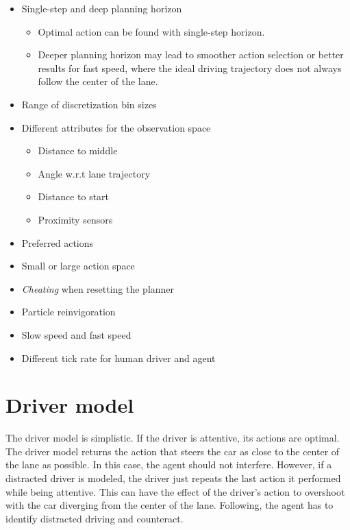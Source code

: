 \begin{itemize}
    \item Single-step and deep planning horizon
    \begin{itemize}
        \item Optimal action can be found with single-step horizon.
        \item Deeper planning horizon may lead to smoother action selection or better results for fast speed, where the ideal driving trajectory does not always follow the center of the lane.
    \end{itemize}
    \item Range of discretization bin sizes
    \item Different attributes for the observation space
    \begin{itemize}
        \item Distance to middle
        \item Angle w.r.t lane trajectory
        \item Distance to start
        \item Proximity sensors
    \end{itemize}
    \item Preferred actions
    \item Small or large action space
    \item \textit{Cheating} when resetting the planner
    \item Particle reinvigoration
    \item Slow speed and fast speed
    \item Different tick rate for human driver and agent
\end{itemize}

\newpage

\section*{Driver model}

The driver model is simplistic. If the driver is attentive, its actions are optimal. The driver model returns the action that steers the car as close to the center of the lane as possible. In this case, the agent should not interfere. However, if a distracted driver is modeled, the driver just repeats the last action it performed while being attentive. This can have the effect of the driver's action to overshoot with the car diverging from the center of the lane. Following, the agent has to identify distracted driving and counteract.

